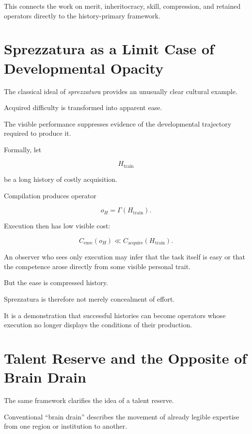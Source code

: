 \documentclass[11pt]{article}
\theoremstyle{remark}
\begin{document}
This connects the work on merit, inheritocracy, skill, compression, and retained operators directly to the history-primary framework.

\section{Sprezzatura as a Limit Case of Developmental Opacity}

The classical ideal of \emph{sprezzatura} provides an unusually clear cultural example.

Acquired difficulty is transformed into apparent ease.

The visible performance suppresses evidence of the developmental trajectory required to produce it.

Formally, let

\begin{equation}
H_{\mathrm{train}}
\end{equation}

be a long history of costly acquisition.

Compilation produces operator

\begin{equation}
o_H=\Gamma(H_{\mathrm{train}}).
\end{equation}

Execution then has low visible cost:

\begin{equation}
C_{\mathrm{exec}}(o_H)
\ll
C_{\mathrm{acquire}}(H_{\mathrm{train}}).
\end{equation}

An observer who sees only execution may infer that the task itself is easy or that the competence arose directly from some visible personal trait.

But the ease is compressed history.

Sprezzatura is therefore not merely concealment of effort.

It is a demonstration that successful histories can become operators whose execution no longer displays the conditions of their production.

\section{Talent Reserve and the Opposite of Brain Drain}

The same framework clarifies the idea of a talent reserve.

Conventional ``brain drain'' describes the movement of already legible expertise from one region or institution to another.
\end{document}
